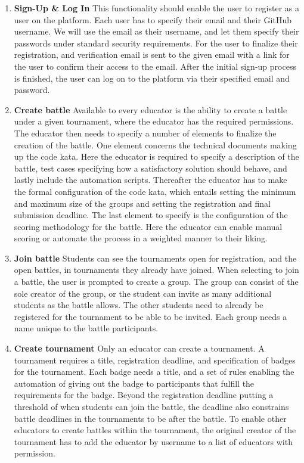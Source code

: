 \begin{enumerate}
    \item {\textbf{Sign-Up \& Log In}}\newline
    This functionality should enable the user to register as a user on the platform. Each user has to specify their email and their GitHub username. We will use the email as their username, and let them specify their passwords under standard security requirements. For the user to finalize their registration, and verification email is sent to the given email with a link for the user to confirm their access to the email. After the initial sign-up process is finished, the user can log on to the platform via their specified email and password. 
    \item {\textbf{Create battle}}\newline
    Available to every educator is the ability to create a battle under a given tournament, where the educator has the required permissions. The educator then needs to specify a number of elements to finalize the creation of the battle. One element concerns the technical documents making up the code kata. Here the educator is required to specify a description of the battle, test cases specifying how a satisfactory solution should behave, and lastly include the automation scripts. Thereafter the educator has to make the formal configuration of the code kata, which entails setting the minimum and maximum size of the groups and setting the registration and final submission deadline. The last element to specify is the configuration of the scoring methodology for the battle. Here the educator can enable manual scoring or automate the process in a weighted manner to their liking. 
    \item {\textbf{Join battle}}\newline
    Students can see the tournaments open for registration, and the open battles, in tournaments they already have joined. When selecting to join a battle, the user is prompted to create a group. The group can consist of the sole creator of the group, or the student can invite as many additional students as the battle allows. The other students need to already be registered for the tournament to be able to be invited. Each group needs a name unique to the battle participants. 
    \item {\textbf{Create tournament}}\newline
    Only an educator can create a tournament. A tournament requires a title, registration deadline, and specification of badges for the tournament. Each badge needs a title, and a set of rules enabling the automation of giving out the badge to participants that fulfill the requirements for the badge. Beyond the registration deadline putting a threshold of when students can join the battle, the deadline also constrains battle deadlines in the tournaments to be after the battle. To enable other educators to create battles within the tournament, the original creator of the tournament has to add the educator by username to a list of educators with permission. 

\end{enumerate}
